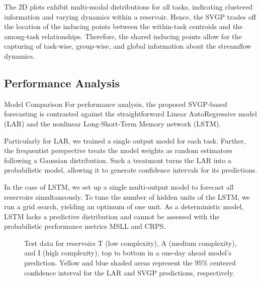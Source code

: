 \begin{frame}
	The 2D plots exhibit multi-modal distributions for all tasks, indicating clustered information and varying dynamics within a reservoir. Hence, the SVGP trades off the location of the inducing points between the within-task centroids and the among-task relationships. Therefore, the shared inducing points allow for the capturing of task-wise, group-wise, and global information about the streamflow dynamics.

\end{frame}

\subsection{Performance Analysis}

\begin{frame}{Model Comparison}
	For performance analysis, the proposed SVGP-based forecasting is contrasted against the straightforward Linear AutoRegressive model (LAR) and the nonlinear Long-Short-Term Memory network (LSTM).
	
	Particularly for LAR, we trained a single output model for each task. Further, the frequentist perspective treats the model weights as random estimators following a Gaussian distribution. Such a treatment turns the LAR into a probabilistic model, allowing it to generate confidence intervals for its predictions.
	
	In the case of LSTM, we set up a single multi-output model to forecast all reservoirs simultaneously. To tune the number of hidden units of the LSTM, we run a grid search, yielding an optimum of one unit. As a deterministic model, LSTM lacks a predictive distribution and cannot be assessed with the probabilistic performance metrics MSLL and CRPS.
\end{frame}


\begin{frame}
	\begin{figure}[htbp]
		\centering
		\setlength\figurewidth{\columnwidth} 
		\setlength{}
		
		\hfill
		\hfill
		
		
		\caption{Test data for reservoirs T (low complexity), A (medium complexity), and I (high complexity), top to bottom in a one-day ahead model's prediction. Yellow and blue shaded areas represent the $95\%$ centered confidence interval for the LAR and SVGP predictions, respectively.}
	\end{figure}
\end{frame}



